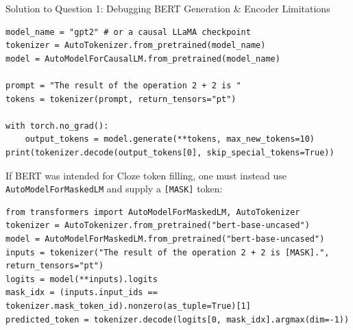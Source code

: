 \documentclass[11pt,a4paper]{article}
\begin{document}
\begin{solutionbox}{Solution to Question 1: Debugging BERT Generation \& Encoder Limitations}
\begin{lstlisting}[style=pythonstyle]
model_name = "gpt2" # or a causal LLaMA checkpoint
tokenizer = AutoTokenizer.from_pretrained(model_name)
model = AutoModelForCausalLM.from_pretrained(model_name)

prompt = "The result of the operation 2 + 2 is "
tokens = tokenizer(prompt, return_tensors="pt")

with torch.no_grad():
    output_tokens = model.generate(**tokens, max_new_tokens=10)
print(tokenizer.decode(output_tokens[0], skip_special_tokens=True))
\end{lstlisting}
If BERT was intended for Cloze token filling, one must instead use \texttt{AutoModelForMaskedLM} and supply a \texttt{[MASK]} token:
\begin{lstlisting}[style=pythonstyle]
from transformers import AutoModelForMaskedLM, AutoTokenizer
tokenizer = AutoTokenizer.from_pretrained("bert-base-uncased")
model = AutoModelForMaskedLM.from_pretrained("bert-base-uncased")
inputs = tokenizer("The result of the operation 2 + 2 is [MASK].", return_tensors="pt")
logits = model(**inputs).logits
mask_idx = (inputs.input_ids == tokenizer.mask_token_id).nonzero(as_tuple=True)[1]
predicted_token = tokenizer.decode(logits[0, mask_idx].argmax(dim=-1))
\end{lstlisting}
\end{solutionbox}
\end{document}
